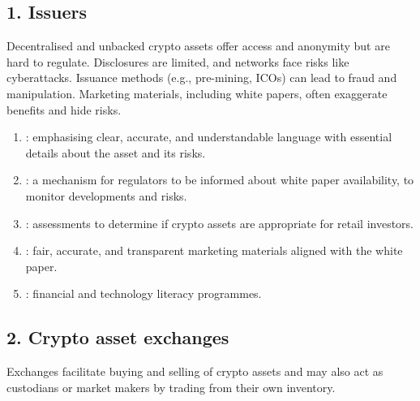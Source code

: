 
\subsection*{1. Issuers}

Decentralised and unbacked crypto assets offer access and anonymity but are hard to regulate.
Disclosures are limited, and networks face risks like cyberattacks. Issuance methods (e.g.,
pre-mining, ICOs) can lead to fraud and manipulation. Marketing materials, including white
papers, often exaggerate benefits and hide risks.

\begin{cikeybox}[title={Regulatory response for issuers}]
\begin{enumerate}[label=\textbf{\alph*)}]
\item {}: emphasising clear, accurate, and understandable language with
essential details about the asset and its risks.
\item {}: a mechanism for regulators to be informed about white
paper availability, to monitor developments and risks.
\item {}: assessments to determine if crypto assets are appropriate for
retail investors.
\item {}: fair, accurate, and transparent marketing materials aligned with the
white paper.
\item {}: financial and technology literacy programmes.
\end{enumerate}
\end{cikeybox}

\subsection*{2. Crypto asset exchanges}

Exchanges facilitate buying and selling of crypto assets and may also act as custodians or
market makers by trading from their own inventory.

